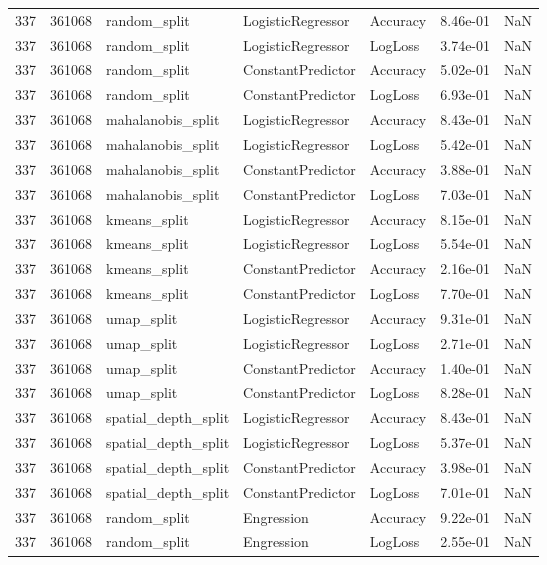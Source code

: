 \begin{tabular}{rrlllrr}
337 & 361068 & random\_split & LogisticRegressor & Accuracy & 8.46e-01 & NaN \\
337 & 361068 & random\_split & LogisticRegressor & LogLoss & 3.74e-01 & NaN \\
337 & 361068 & random\_split & ConstantPredictor & Accuracy & 5.02e-01 & NaN \\
337 & 361068 & random\_split & ConstantPredictor & LogLoss & 6.93e-01 & NaN \\
337 & 361068 & mahalanobis\_split & LogisticRegressor & Accuracy & 8.43e-01 & NaN \\
337 & 361068 & mahalanobis\_split & LogisticRegressor & LogLoss & 5.42e-01 & NaN \\
337 & 361068 & mahalanobis\_split & ConstantPredictor & Accuracy & 3.88e-01 & NaN \\
337 & 361068 & mahalanobis\_split & ConstantPredictor & LogLoss & 7.03e-01 & NaN \\
337 & 361068 & kmeans\_split & LogisticRegressor & Accuracy & 8.15e-01 & NaN \\
337 & 361068 & kmeans\_split & LogisticRegressor & LogLoss & 5.54e-01 & NaN \\
337 & 361068 & kmeans\_split & ConstantPredictor & Accuracy & 2.16e-01 & NaN \\
337 & 361068 & kmeans\_split & ConstantPredictor & LogLoss & 7.70e-01 & NaN \\
337 & 361068 & umap\_split & LogisticRegressor & Accuracy & 9.31e-01 & NaN \\
337 & 361068 & umap\_split & LogisticRegressor & LogLoss & 2.71e-01 & NaN \\
337 & 361068 & umap\_split & ConstantPredictor & Accuracy & 1.40e-01 & NaN \\
337 & 361068 & umap\_split & ConstantPredictor & LogLoss & 8.28e-01 & NaN \\
337 & 361068 & spatial\_depth\_split & LogisticRegressor & Accuracy & 8.43e-01 & NaN \\
337 & 361068 & spatial\_depth\_split & LogisticRegressor & LogLoss & 5.37e-01 & NaN \\
337 & 361068 & spatial\_depth\_split & ConstantPredictor & Accuracy & 3.98e-01 & NaN \\
337 & 361068 & spatial\_depth\_split & ConstantPredictor & LogLoss & 7.01e-01 & NaN \\
337 & 361068 & random\_split & Engression & Accuracy & 9.22e-01 & NaN \\
337 & 361068 & random\_split & Engression & LogLoss & 2.55e-01 & NaN \\

\end{tabular}
